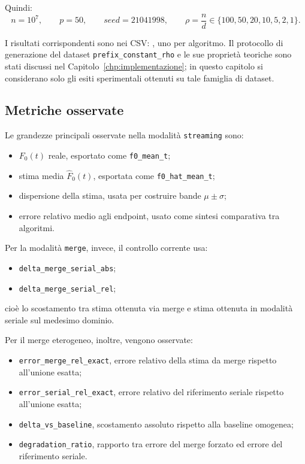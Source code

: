 Quindi:
\[
n=10^7,\qquad p=50,\qquad seed=21041998,\qquad
\rho=\frac{n}{d}\in\{100,50,20,10,5,2,1\}.
\]

I risultati corrispondenti sono nei CSV:
,
uno per algoritmo. Il protocollo di generazione del dataset
\texttt{prefix\_constant\_rho} e le sue proprietà teoriche sono stati discussi
nel Capitolo~\ref{chp:implementazione}; in questo capitolo si considerano solo
gli esiti sperimentali ottenuti su tale famiglia di dataset.

\subsection{Metriche osservate}

Le grandezze principali osservate nella modalità \texttt{streaming} sono:
\begin{itemize}
    \item \(F_0(t)\) reale, esportato come \texttt{f0\_mean\_t};
    \item stima media \(\hat{F}_0(t)\), esportata come \texttt{f0\_hat\_mean\_t};
    \item dispersione della stima, usata per costruire bande \(\mu \pm \sigma\);
    \item errore relativo medio agli endpoint, usato come sintesi comparativa tra algoritmi.
\end{itemize}

Per la modalità \texttt{merge}, invece, il controllo corrente usa:
\begin{itemize}
    \item \texttt{delta\_merge\_serial\_abs};
    \item \texttt{delta\_merge\_serial\_rel};
\end{itemize}
cioè lo scostamento tra stima ottenuta via merge e stima ottenuta in modalità
seriale sul medesimo dominio.

Per il merge eterogeneo, inoltre, vengono osservate:
\begin{itemize}
    \item \texttt{error\_merge\_rel\_exact}, errore relativo della stima da
    merge rispetto all'unione esatta;
    \item \texttt{error\_serial\_rel\_exact}, errore relativo del riferimento
    seriale rispetto all'unione esatta;
    \item \texttt{delta\_vs\_baseline}, scostamento assoluto rispetto alla
    baseline omogenea;
    \item \texttt{degradation\_ratio}, rapporto tra errore del merge forzato ed
    errore del riferimento seriale.
\end{itemize}

